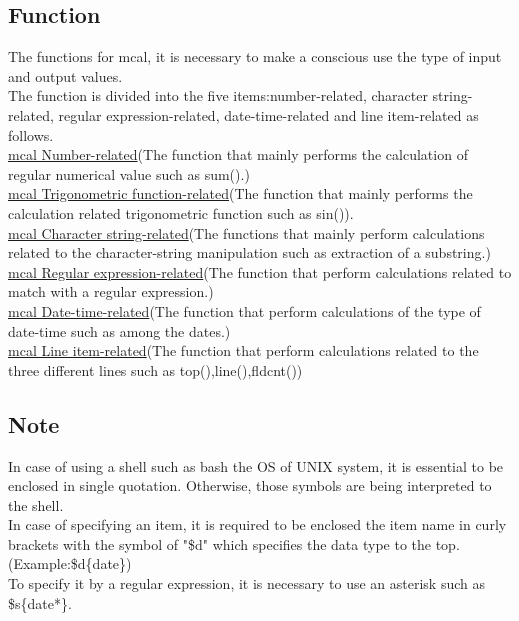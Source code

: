 \documentclass[fleqn,a4paper]{jarticle}
\begin{document}
\subsection*{Function}
\noindent
The functions for mcal, it is necessary to make a conscious use the type of input and output values.\\
The function is divided into the five items:number-related, character string-related, regular expression-related, date-time-related and line item-related as follows.\\

\noindent
\href{run:sutikanren.pdf}{mcal Number-related}(The function that mainly performs the calculation of regular numerical value  such as sum().)\\
\href{run:sankakukansu.pdf}{mcal Trigonometric function-related}(The function that mainly performs the calculation related trigonometric function such as sin()).\\
\href{run:mojiretu.pdf}{mcal Character string-related}(The functions that mainly perform calculations related to the character-string manipulation such as extraction of a substring.)\\
\href{run:seikihyougen.pdf}{mcal Regular expression-related}(The function that perform calculations related to match with a regular expression.)\\
\href{run:hizuke.pdf}{mcal Date-time-related}(The function that perform calculations of the type of date-time such as among the dates.)\\
\href{run:gyoukoumoku.pdf}{mcal Line item-related}(The function that perform calculations related to the three different lines such as top(),line(),fldcnt())\\

\subsection*{Note}
\noindent
In case of using a shell such as bash the OS of UNIX system, it is essential to be enclosed in single quotation. Otherwise, those symbols are being interpreted to the shell.\\
In case of specifying an item, it is required to be enclosed the item name in curly brackets with the symbol of "\$d" which specifies the data type to the top.(Example:\$d\{date\})\\
To specify it by a regular expression, it is necessary to use an asterisk such as \$s\{date*\}.\\
\end{document}
